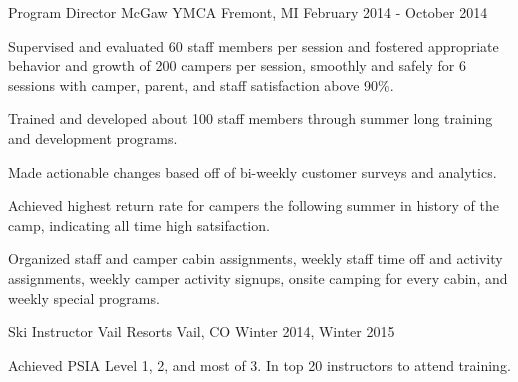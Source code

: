 

\begin{cventries}

  \cventry
    {Program Director} %
    {McGaw YMCA} %
    {Fremont, MI} %
    {February 2014 - October 2014} %
    {
      \begin{cvitems} %
        \item {Supervised and evaluated 60 staff members per session and fostered appropriate behavior and growth of 200 campers per session, smoothly and safely for 6 sessions with camper, parent, and staff satisfaction above 90\%.}
        \item {Trained and developed about 100 staff members through summer long training and development programs.}
        \item {Made actionable changes based off of bi-weekly customer surveys and analytics.}
        \item {Achieved highest return rate for campers the following summer in history of the camp, indicating all time high satsifaction.}
        \item {Organized staff and camper cabin assignments, weekly staff time off and activity assignments, weekly camper activity signups, onsite camping for every cabin, and weekly special programs.}
      \end{cvitems}
    }
    
 \cventry
    {Ski Instructor} %
    {Vail Resorts} %
    {Vail, CO} %
    {Winter 2014, Winter 2015} %
    {
      \begin{cvitems} %
        \item {Achieved PSIA Level 1, 2, and most of 3. In top 20 instructors to attend training.}
      \end{cvitems}
    }



\end{cventries}
